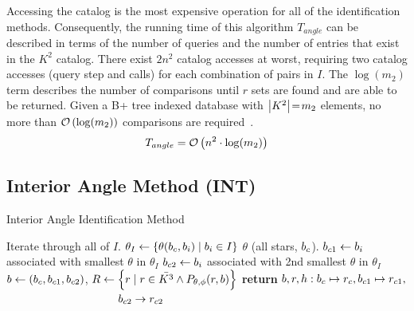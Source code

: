 \documentclass[conference]{IEEEtran}
\begin{document}
    Accessing the catalog is the most expensive operation for all of the identification methods.
    Consequently, the running time of this algorithm $T_{angle}$ can be described in terms of the number of queries and
    the number of entries that exist in the $K^2$ catalog.
    There exist $2n^2$ catalog accesses at worst, requiring two catalog accesses (query step and  calls) for
    each combination of pairs in $I$.
    The $\log (m_2)$ term describes the number of comparisons until $r$ sets are found and are able to be returned.
    Given a B+ tree indexed database with $\left| K^2 \right| \!=\! m_2$ elements, no more than $\mathcal{O} \left( \log(m_2) \right)$
    comparisons are required~\cite{patel:advanceTreeStructures}.
    \begin{equation}\label{eq:complexityAngle}
    T_{angle} = \bigO\left( n^2 \cdot \log(m_2) \right)
    \end{equation}


    \subsection{Interior Angle Method (INT)}\label{subsec:interiorAngleMethod}
    \begin{algorithm}
        \caption{Interior Angle Identification Method} \label{algorithm:interiorAngleIdentification}
        \begin{algorithmic}[1]
              \Comment Iterate through all of $I$.
            \State $\theta_I \gets \{\theta(b_c, b_i) \mid b_i \in I\}$ \Comment $\theta$
            (all stars, $b_c$).
            \State $b_{c1} \gets b_i$ associated with smallest $\theta$ in $\theta_I$
            \State $b_{c2} \gets b_i$ associated with 2nd smallest $\theta$ in $\theta_I$
            \State $b \gets \left(b_c, b_{c1}, b_{c2}\right)$, $R \gets \left\{  r \mid r \in \bar{K^3} \land
            P_{\theta, \phi}(r, b)  \right\}$
            \State \textbf{return} $b, r, h: b_c \mapsto r_c, b_{c1} \mapsto r_{c1}, $
            \State \ \ \ \ \ \ \ \ \ \ \ \ \ \ \ \ \ \ \ \  $b_{c2} \rightarrow r_{c2}$
            \EndIf
            \EndFor
            \EndFunction
        \end{algorithmic}
    \end{algorithm}
\end{document}
